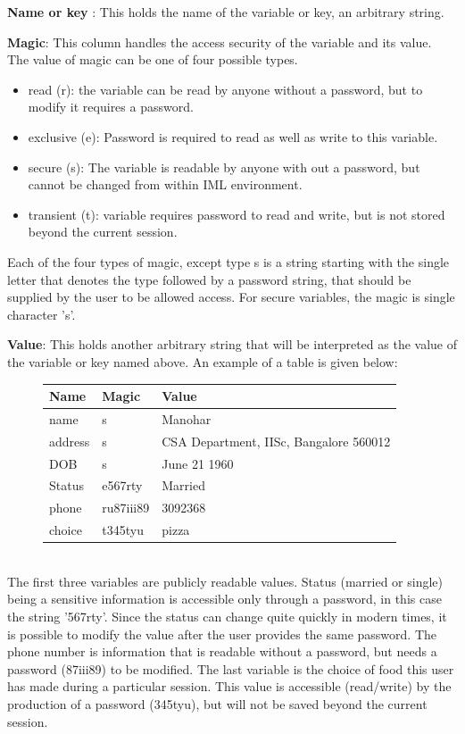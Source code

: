\documentclass[11pt]{article}
\begin{document}
{\bf Name or key} : This holds the name of the variable or key, an arbitrary string. 

{\bf Magic}: This column handles the access security of the variable and its value. The value of magic can be one of four possible types. 
\begin{itemize}\addtolength{\itemsep}{-0.5\baselineskip}
\item read (r): the variable can be read by anyone without a password, but to modify it requires a password.
\item exclusive (e): Password is required to read as well as write to this variable.
\item secure (s): The variable is readable by anyone with out a password, but cannot be changed from within IML environment. 
\item transient (t): variable requires password to read and write, but is not stored beyond the current session. 
\end{itemize}

Each of the four types of magic, except type s is a string starting with the single letter that denotes the type followed by a password string, that should be supplied by the user to be allowed access. For secure variables, the magic is single character 's'. 

{\bf Value}: This holds another arbitrary string that will be interpreted as the value of the variable or key named above. 
An example of a table is given below:
\begin{figure}[!h]
\begin{center}
\begin{tabular}[!h]{|lll|}
     \hline
      Name  &   Magic   &     Value \\
     \hline
     name   &   s       & Manohar \\
     address &  s       & CSA Department, IISc, Bangalore 560012\\
     DOB     &  s       & June 21 1960 \\
     Status  &  e567rty & Married \\
     phone   & ru87iii89 & 3092368 \\
     choice  & t345tyu  &  pizza \\
     \hline
\end{tabular}
\end{center}
\end{figure}
\\ The first three variables are publicly readable values. Status (married or single) being a sensitive information is accessible only through a password, in this case the string '567rty'. Since the status can change quite quickly in modern times, it is possible to modify the value after the user provides the same password. The phone number is information that is readable without a password, but needs a password (87iii89) to be modified. The last variable is the choice of food this user has made during a particular session. This value is accessible (read/write) by the production of a password (345tyu), but will not be saved beyond the current session. 
 
\end{document}

